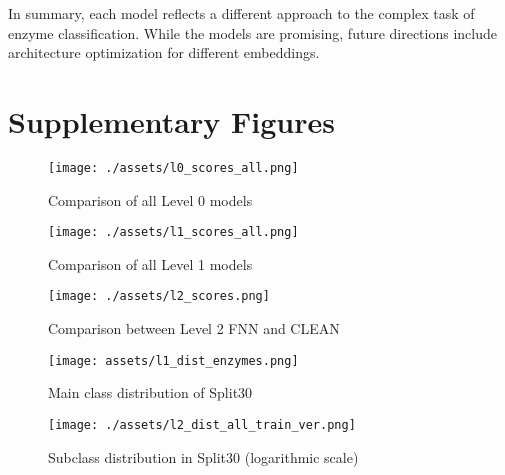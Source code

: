 \documentclass{bioinfo}
\begin{document}
In summary, each model reflects a different approach to the complex task of enzyme classification.
While the models are promising, future directions include architecture optimization for different embeddings.

\section{Supplementary Figures}\label{sec:supplementary figures}
\begin{figure}[!ht]
	\texttt{[image: ./assets/l0\_scores\_all.png]}
	\caption{Comparison of all Level 0 models}
	\label{fig:l0_comp_all}
\end{figure}
\begin{figure}[!ht]
	\texttt{[image: ./assets/l1\_scores\_all.png]}
	\caption{Comparison of all Level 1 models}
	\label{fig:l1_comp_all}
\end{figure}

\begin{figure}[!ht]
	\texttt{[image: ./assets/l2\_scores.png]}
	\caption{Comparison between Level 2 FNN and CLEAN}
	\label{fig:FNN_scores_l2}
\end{figure}

\begin{figure}[!hb]
\texttt{[image: assets/l1\_dist\_enzymes.png]}
\caption{Main class distribution of Split30}\label{fig:l1_dist_train}
\end{figure}

\begin{figure}[!ht]
\texttt{[image: ./assets/l2\_dist\_all\_train\_ver.png]}
\caption{Subclass distribution in Split30 (logarithmic scale)}\label{fig:l2_dist_train}
\end{figure}

\clearpage

 

\end{document}
